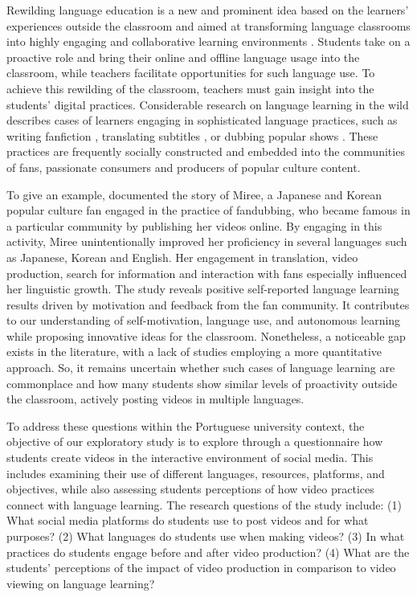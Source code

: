 Rewilding language education is a new and prominent idea based on the
learners' experiences outside the classroom and aimed at transforming
language classrooms into highly engaging and collaborative learning
environments \cite{thorne2021}. Students take on a proactive
role and bring their online and offline language usage into the
classroom, while teachers facilitate opportunities for such language
use. To achieve this rewilding of the classroom, teachers must gain
insight into the students' digital practices. Considerable research on
language learning in the wild describes cases of learners engaging in
sophisticated language practices, such as writing fanfiction \cite{black2006}, translating subtitles \cite{zhang2016}, or dubbing
popular shows \cite{shafirova2019}. These practices are
frequently socially constructed and embedded into the communities of
fans, passionate consumers and producers of popular culture content.

To give an example, \textcite{zhang2022} documented the story
of Miree, a Japanese and Korean popular culture fan engaged in the
practice of fandubbing, who became famous in a particular community by
publishing her videos online. By engaging in this activity, Miree
unintentionally improved her proficiency in several languages such as
Japanese, Korean and English. Her engagement in translation, video
production, search for information and interaction with fans especially
influenced her linguistic growth. The study reveals positive
self-reported language learning results driven by motivation and
feedback from the fan community. It contributes to our understanding of
self-motivation, language use, and autonomous learning while proposing
innovative ideas for the classroom. Nonetheless, a noticeable gap exists
in the literature, with a lack of studies employing a more quantitative
approach. So, it remains uncertain whether such cases of language
learning are commonplace and how many students show similar levels of
proactivity outside the classroom, actively posting videos in multiple
languages.

To address these questions within the Portuguese university context, the
objective of our exploratory study is to explore through a questionnaire
how students create videos in the interactive environment of social
media. This includes examining their use of different languages,
resources, platforms, and objectives, while also assessing
students\textquotesingle{} perceptions of how video practices connect
with language learning. The research questions of the study include: (1)
What social media platforms do students use to post videos and for what
purposes? (2) What languages do students use when making videos? (3) In
what practices do students engage before and after video production? (4)
What are the students' perceptions of the impact of video production in
comparison to video viewing on language learning?

